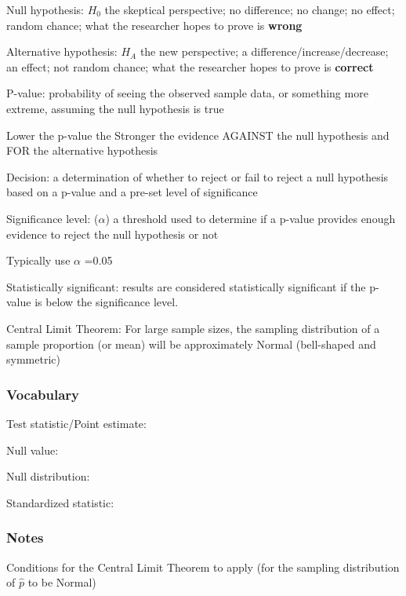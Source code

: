 \documentclass[
]{report}
\newcommand{\rgs}{\vspace{12pt}} %
\newcommand{\rgi}{\hspace{24pt}}  %
\begin{document}
Null hypothesis: \(H_0\) the skeptical perspective; no difference; no change; no effect; random chance; what the researcher hopes to prove is \textbf{wrong}

Alternative hypothesis: \(H_A\) the new perspective; a difference/increase/decrease; an effect; not random chance; what the researcher hopes to prove is \textbf{correct}

P-value: probability of seeing the observed sample data, or something more extreme, assuming the null hypothesis is true

\rgi Lower the p-value the Stronger the evidence AGAINST the null hypothesis and FOR the alternative hypothesis

Decision: a determination of whether to reject or fail to reject a null hypothesis based on a p-value and a pre-set level of significance

Significance level: (\(\alpha\)) a threshold used to determine if a p-value provides enough evidence to reject the null hypothesis or not

\rgi Typically use \(\alpha\) =0.05

Statistically significant: results are considered statistically significant if the p-value is below the significance level.

Central Limit Theorem: For large sample sizes, the sampling distribution of a sample proportion (or mean) will be approximately Normal (bell-shaped and symmetric)

\hypertarget{vocabulary-12}{%
\subsubsection*{Vocabulary}\label{vocabulary-12}}

Test statistic/Point estimate:
\rgs

Null value:
\rgs

Null distribution:\\
\rgs

Standardized statistic:
\rgs

\hypertarget{notes-17}{%
\subsubsection*{Notes}\label{notes-17}}

Conditions for the Central Limit Theorem to apply (for the sampling distribution of \(\hat{p}\) to be Normal)
\end{document}
